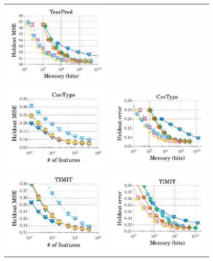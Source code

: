 \begin{figure}
\begin{tabular}{c c}
		\includegraphics[width=0.4\linewidth]{figures/yearpred_MSE_vs_n_memory_all_line.pdf} \\
		\includegraphics[width=0.4\linewidth]{figures/covtype_error_vs_n_feat_all_line.pdf} &
		\includegraphics[width=0.4\linewidth]{figures/covtype_error_vs_n_memory_all_line.pdf} \\
		\includegraphics[width=0.4\linewidth]{figures/timit_error_vs_n_feat_all_line.pdf} &
		\includegraphics[width=0.4\linewidth]{figures/timit_error_vs_n_memory_all_line.pdf} \\

\end{tabular}
\end{figure}
